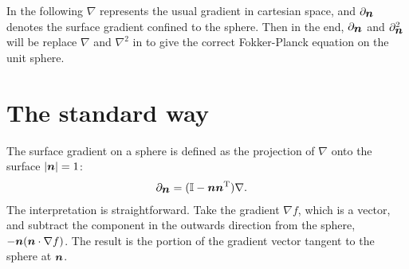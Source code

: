 \documentclass[thesis.tex]{subfiles}
\begin{document}
In the following $\nabla$ represents the usual gradient in cartesian space, and $\partial_{\mbox{\boldmath$n$}}$ denotes the surface gradient confined to the sphere. Then in the end, $\partial_{\mbox{\boldmath$n$}}$ and $\partial^2_{\mbox{\boldmath$n$}}$ will be replace $\nabla$ and $\nabla^2$ in  to give the correct Fokker-Planck equation on the unit sphere.

\section{The standard way}

 The surface gradient on a sphere is defined as the projection of $\nabla$ onto the surface $|\mbox{\boldmath$n$}|=1$:
\begin{align}
	\partial_{\ve n} &= (\ma I - \ve n \ve n \transpose) \nabla.\eqnlab{spherenabla1}
\end{align}
The interpretation is straightforward. Take the gradient $\nabla f$, which is a vector, and subtract the component in the outwards direction from the sphere, $-\mbox{\boldmath$n$}(\mbox{\boldmath$n$} \cdot \nabla f)$. The result is the portion of the gradient vector tangent to the sphere at $\mbox{\boldmath$n$}$.
\end{document}
